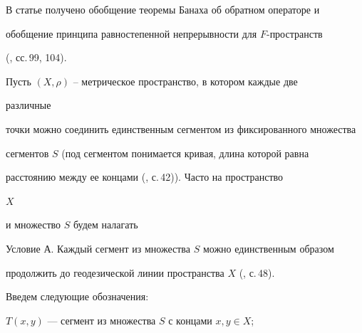  


\pagestyle{plain} %


 


 




 


\maketitle 


 




 


В статье получено обобщение теоремы Банаха об обратном операторе и 


обобщение принципа равностепенной непрерывности для $F$-пространств 


(\cite{Sad}, сс.\,99, 104). 


 


Пусть $(X,\rho)$ -- метрическое пространство, в котором каждые две 


различные 


точки можно соединить единственным сегментом из фиксированного множества 


сегментов $S$ (под сегментом понимается кривая, длина которой равна 


расстоянию между ее концами (\cite{Bus}, с.\,42)). Часто на пространство 


$X$ 


и множество $S$ будем налагать 


 


Условие А. Каждый сегмент из множества $S$ можно единственным образом 


продолжить до геодезической линии пространства $X$ (\cite{Bus}, с.\,48). 


 


Введем следующие обозначения: 


 


\noindent $T(x,y)$ --- сегмент из множества $S$ с концами $x,y\in X$; 


 


